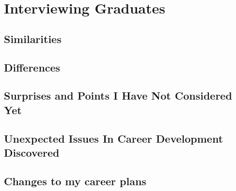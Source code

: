 \section{Interviewing Graduates}

\subsection{Similarities}

\subsection{Differences}

\subsection{Surprises and Points I Have Not Considered Yet}

\subsection{Unexpected Issues In Career Development Discovered}

\subsection{Changes to my career plans}
